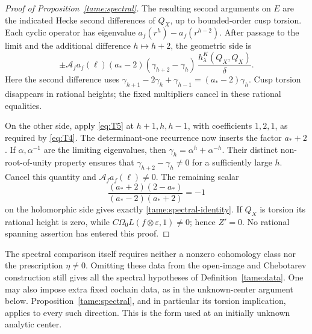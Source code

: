 \begin{proof}[Proof of Proposition~\ref{tame:spectral}]
The resulting second arguments on \(E\) are the indicated
Hecke second differences of \(Q_X\), up to bounded-order cusp
torsion. Each cyclic operator has eigenvalue
\(a_f(r^h)-a_f(r^{h-2})\). After passage to the limit and the
additional difference \(h\mapsto h+2\), the geometric side is
\begin{equation}\label{tame:geometric-side}
 \pm\mathcal A_fa_f(\ell)(a_*-2)
       (\gamma_{h+2}-\gamma_h)\,
       \frac{h_\lambda^K(Q_X,Q_X)}{\delta}.
\end{equation}
Here the second difference uses
\(\gamma_{h+1}-2\gamma_h+\gamma_{h-1}=(a_*-2)\gamma_h\).
Cusp torsion disappears in rational heights; the fixed
multipliers cancel in these rational equalities.

On the other side, apply \eqref{eq:T5} at \(h+1,h,h-1\),
with coefficients \(1,2,1\), as required by \eqref{eq:T4}.
The determinant-one recurrence now inserts the factor
\(a_*+2\). If \(\alpha,\alpha^{-1}\) are the limiting
eigenvalues, then \(\gamma_h=\alpha^h+\alpha^{-h}\).
Their distinct non-root-of-unity property ensures that
\(\gamma_{h+2}-\gamma_h\ne0\) for a sufficiently large \(h\).
Cancel this quantity and \(\mathcal A_fa_f(\ell)\ne0\).
The remaining scalar
\[
 \frac{(a_*+2)(2-a_*)}{(a_*-2)(a_*+2)}=-1
\]
on the holomorphic side gives exactly
\eqref{tame:spectral-identity}. If \(Q_X\) is torsion its
rational height is zero, while
\(C\Omega_0L(f\otimes\varepsilon,1)\ne0\); hence \(Z'=0\).
No rational spanning assertion has entered this proof.
\end{proof}

\begin{remark}\label{tame:unknown-rank-direction}
The spectral comparison itself requires neither a nonzero cohomology
class nor the prescription \(\eta\ne0\). Omitting these data from the
open-image and Chebotarev construction still gives all the spectral
hypotheses of Definition~\ref{tame:data}. One may also impose extra
fixed cochain data, as in the unknown-center argument below.
Proposition~\ref{tame:spectral}, and in particular its
torsion implication, applies to every such direction.
This is the form used at an initially unknown analytic center.
\end{remark}

